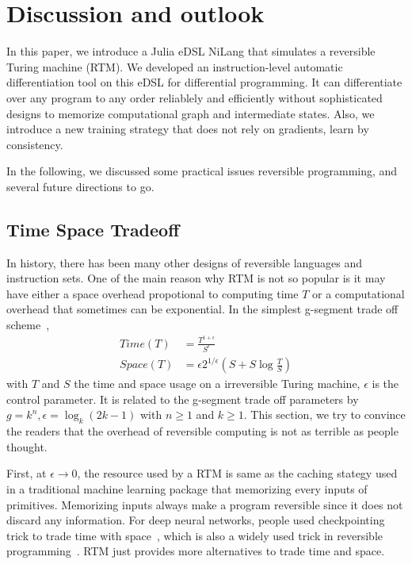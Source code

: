 \documentclass[aps,twocolumn,longbibliography,english,superscriptaddress]{revtex4-1}
\newcommand{\<}{\langle}
\renewcommand{\>}{\rangle}
\theoremstyle{definition}\newtheorem{definition}{\textit{Definition}}
\begin{document}
\section{Discussion and outlook}\label{sec:discussion}
In this paper, we introduce a Julia eDSL NiLang that simulates a reversible Turing machine (RTM).
We developed an instruction-level automatic differentiation tool on this eDSL for differential programming.
It can differentiate over any program to any order reliablely and efficiently without sophisticated designs to memorize computational graph and intermediate states.
Also, we introduce a new training strategy that does not rely on gradients, learn by consistency.

In the following, we discussed some practical issues reversible programming, and several future directions to go.

\subsection{Time Space Tradeoff}\label{sec:timespace}
In history, there has been many other designs of reversible languages and instruction sets.
One of the main reason why RTM is not so popular is it may have either a space overhead propotional to computing time $T$ or a computational overhead that sometimes can be exponential.
In the simplest g-segment trade off scheme~\cite{Bennett1989,Levine1990},
\begin{align}
    Time(T) &= \frac{T^{1+\epsilon}}{S^\epsilon}\\
    Space(T) &= \epsilon 2^{1/\epsilon}(S+S\log\frac{T}{S})
\end{align}
with $T$ and $S$ the time and space usage on a irreversible Turing machine, $\epsilon$ is the control parameter.
It is related to the g-segment trade off parameters by $g = k^n, \epsilon = \log_k(2k-1)$ with $n\geq 1$ and $k\geq 1$.
This section, we try to convince the readers that the overhead of reversible computing is not as terrible as people thought.

First, at $\epsilon \rightarrow 0$, the resource used by a RTM is same as the caching stategy used in a traditional machine learning package that memorizing every inputs of primitives. Memorizing inputs always make a program reversible since it does not discard any information.
For deep neural networks, people used checkpointing trick to trade time with space~\cite{Chen2016}, which is also a widely used trick in reversible programming~\cite{Perumalla2013}. RTM just provides more alternatives to trade time and space.
\end{document}

